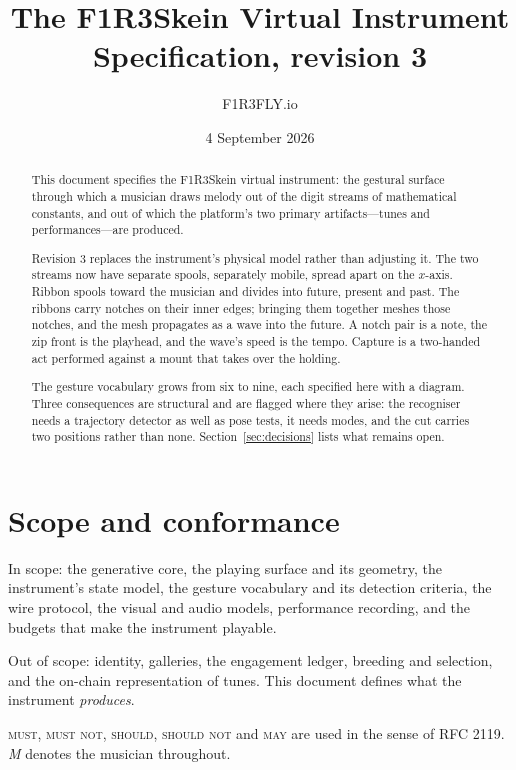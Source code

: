 \documentclass[11pt,a4paper]{article}
\title{\textbf{The F1R3Skein Virtual Instrument}\\[0.3em]
\large Specification, revision 3}
\author{F1R3FLY.io}
\date{4 September 2026}
\newcommand{\MUST}{\textsc{must}}
\newcommand{\MUSTNOT}{\textsc{must not}}
\newcommand{\SHOULD}{\textsc{should}}
\newcommand{\SHOULDNOT}{\textsc{should not}}
\newcommand{\MAY}{\textsc{may}}
\theoremstyle{definition}
\theoremstyle{plain}
\theoremstyle{remark}
\begin{document}
\maketitle

\begin{abstract}
\noindent
This document specifies the F1R3Skein virtual instrument: the gestural surface through which a
musician draws melody out of the digit streams of mathematical constants, and out of which the
platform's two primary artifacts---tunes and performances---are produced.

Revision 3 replaces the instrument's physical model rather than adjusting it. The two streams now
have separate spools, separately mobile, spread apart on the $x$-axis. Ribbon spools toward the
musician and divides into future, present and past. The ribbons carry notches on their inner
edges; bringing them together meshes those notches, and the mesh propagates as a wave into the
future. A notch pair is a note, the zip front is the playhead, and the wave's speed is the tempo.
Capture is a two-handed act performed against a mount that takes over the holding.

The gesture vocabulary grows from six to nine, each specified here with a diagram. Three
consequences are structural and are flagged where they arise: the recogniser needs a trajectory
detector as well as pose tests, it needs modes, and the cut carries two positions rather than none.
Section~\ref{sec:decisions} lists what remains open.
\end{abstract}

\tableofcontents

\section{Scope and conformance}

In scope: the generative core, the playing surface and its geometry, the instrument's state model,
the gesture vocabulary and its detection criteria, the wire protocol, the visual and audio models,
performance recording, and the budgets that make the instrument playable.

Out of scope: identity, galleries, the engagement ledger, breeding and selection, and the on-chain
representation of tunes. This document defines what the instrument \emph{produces}.

\MUST, \MUSTNOT, \SHOULD, \SHOULDNOT{} and \MAY{} are used in the sense of RFC 2119.
\emph{M} denotes the musician throughout.
\end{document}
